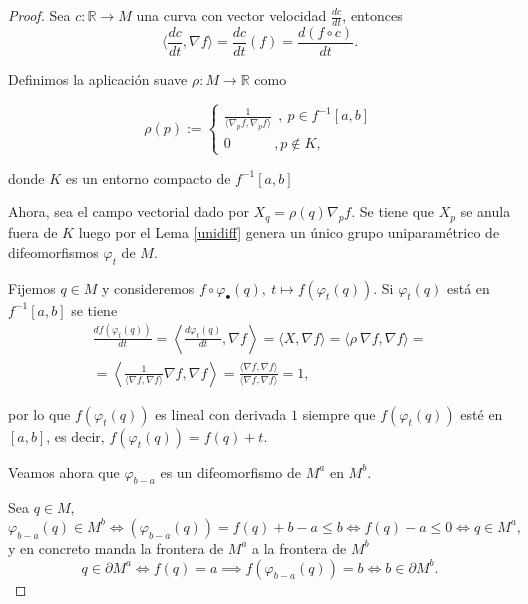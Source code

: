 \begin{proof}
    Sea $c:\mathbb{R}\to M$ una curva con vector velocidad $\frac{dc}{dt}$, entonces
    \begin{equation*}
        \langle \frac{dc}{dt}, \nabla f\rangle = \frac{dc}{dt}(f)=\frac{d(f\circ c)}{dt}.
    \end{equation*}

    Definimos la aplicación suave $\rho : M\to \mathbb{R}$ como

    \begin{equation*}
        \rho(p):=
        \begin{cases}
            \frac{1}{\langle \nabla_pf, \nabla_pf\rangle}~~,~p\in f^{-1}[a,b]\\
            0 ~~~~~~~~~~~~~~,p\notin K,
        \end{cases}
    \end{equation*}

    donde $K$ es un entorno compacto de $f^{-1}[a,b]$

    Ahora, sea el campo vectorial dado por $X_q=\rho(q)\nabla_pf$. Se tiene que $X_p$ se anula fuera de $K$ luego por el Lema \ref{unidiff} genera un único grupo uniparamétrico de difeomorfismos $\varphi_t$ de $M$.

    Fijemos $q\in M$ y consideremos $f\circ\varphi_{\bullet}(q),~t\mapsto f(\varphi_t(q))$. Si $\varphi_t(q)$ está en $f^{-1}[a,b]$ se tiene
    \begin{align*}
        \frac{df(\varphi_t(q))}{dt} = \left\langle \frac{d\varphi_t(q)}{dt},\nabla f\right\rangle = \langle X, \nabla f\rangle = \langle \rho~ \nabla f, \nabla f\rangle =\\ =\left\langle \frac{1}{\langle \nabla f,\nabla f\rangle}\nabla f,\nabla f\right\rangle=
        \frac{\langle \nabla f,\nabla f\rangle}{\langle \nabla f,\nabla f\rangle}= 1,
    \end{align*}

    por lo que $f(\varphi_t(q))$ es lineal con derivada $1$ siempre que $f(\varphi_t(q))$ esté en $[a,b]$, es decir, $f(\varphi_t(q))=f(q)+t$.

    Veamos ahora que $\varphi_{b-a}$ es un difeomorfismo de $M^a$ en $M^b$.

    Sea $q\in M$,
    \begin{equation*}
        \varphi_{b-a}(q)\in M^b \iff(\varphi_{b-a}(q))=f(q)+b-a\le b \iff f(q)-a\le 0 \iff q\in M^a,
    \end{equation*}
     y en concreto manda la frontera de $M^a$ a la frontera de $M^b$
     \begin{equation*}
         q\in \partial M^a \iff f(q)=a \implies f(\varphi_{b-a}(q))=b \iff b\in \partial M^b.
     \end{equation*}


\end{proof}
